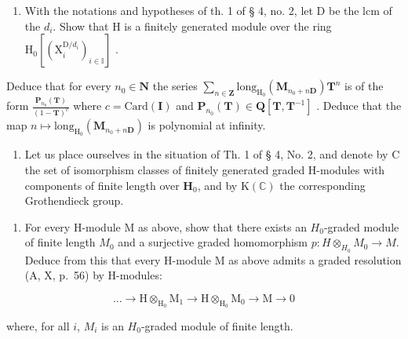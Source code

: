 \begin{enumerate}
\def\labelenumi{\alph{enumi})}
\setcounter{enumi}{1}
\tightlist
\item
  With the notations and hypotheses of th. 1 of § 4, no. 2, let D be the lcm of the \(d_{i}\). Show that H is a finitely generated module over the ring \(\mathrm{H}_{0}[(\mathrm{X}_{i}^{\mathrm{D}/d_{i}})_{i\in\mathbb{I}}]\) .
\end{enumerate}

Deduce that for every \(n_{0}\in\mathbf{N}\) the series \(\sum_{n\in\mathbf{Z}}\mathrm{long}_{\mathrm{H}_{0}}(\mathbf{M}_{n_{0}+n\mathbf{D}})\mathbf{T}^{n}\) is of the form \(\frac{\mathbf{P}_{n_{0}}(\mathbf{T})}{(1-\mathbf{T})^{c}}\) where \(c=\mathrm{Card}(\mathbf{I})\) and \(\mathbf{P}_{n_{0}}(\mathbf{T})\in\mathbf{Q}[\mathbf{T},\mathbf{T}^{-1}]\) . Deduce that the map \(n\mapsto\mathrm{long}_{\mathrm{H}_{0}}(\mathbf{M}_{n_{0}+n\mathbf{D}})\) is polynomial at infinity.

\begin{enumerate}
\def\labelenumi{\arabic{enumi})}
\setcounter{enumi}{3}
\tightlist
\item
  Let us place ourselves in the situation of Th. 1 of § 4, No. 2, and denote by C the set of isomorphism classes of finitely generated graded H-modules with components of finite length over \(\mathbf{H}_0\), and by \(\mathrm{K}(\mathbb{C})\) the corresponding Grothendieck group.
\end{enumerate}

\begin{enumerate}
\def\labelenumi{\alph{enumi})}
\tightlist
\item
  For every H-module M as above, show that there exists an \(H_{0}\)-graded module of finite length \(M_{0}\) and a surjective graded homomorphism \(p:H\otimes_{H_{0}}M_{0}\to M\). Deduce from this that every H-module M as above admits a graded resolution (A, X, p.~56) by H-modules:
\end{enumerate}

\[
\dots \rightarrow \mathrm{H} \otimes_ {\mathrm{H} _ {0}} \mathrm{M} _ {1} \rightarrow \mathrm{H} \otimes_ {\mathrm{H} _ {0}} \mathrm{M} _ {0} \rightarrow \mathrm{M} \rightarrow 0
\]

where, for all \(i\), \(M_{i}\) is an \(H_{0}\)-graded module of finite length.

